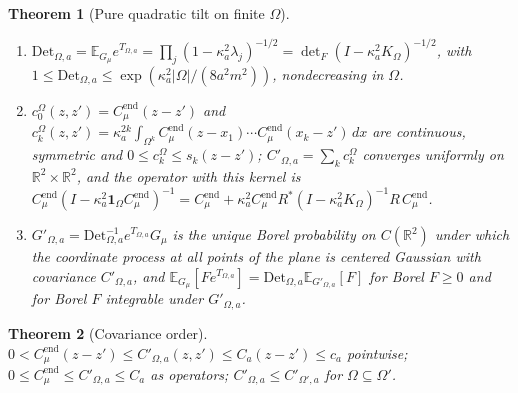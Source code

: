 \documentclass[11pt]{article}
\theoremstyle{plain}
\newtheorem{theorem}{Theorem}[section]
\theoremstyle{definition}
\theoremstyle{remark}
\newcommand{\R}{\mathbb{R}}
\newcommand{\E}{\mathbb{E}}
\newcommand{\ind}{\mathbf{1}}
\newcommand{\Cend}{C^{\mathrm{end}}_{\mu}}
\newcommand{\Det}{\mathrm{Det}}
\begin{document}
\begin{theorem}[Pure quadratic tilt on finite $\Omega$]\label{thm:G-tilt}
\begin{enumerate}[label=(\alph*)]
\item $\Det_{\Omega,a}=\E_{G_\mu}e^{T_{\Omega,a}}=\prod_j(1-\kappa_a^{2}\lambda_j)^{-1/2}
  =\det_F(I-\kappa_a^{2}K_\Omega)^{-1/2}$, with
  $1\le\Det_{\Omega,a}\le\exp(\kappa_a^{2}|\Omega|/(8a^{2}m^{2}))$, nondecreasing in $\Omega$.
\item $c^{\Omega}_0(z,z')=\Cend(z-z')$ and
  $c^{\Omega}_k(z,z')=\kappa_a^{2k}\int_{\Omega^{k}}\Cend(z-x_1)\cdots\Cend(x_k-z')\,dx$ are
  continuous, symmetric and $0\le c^{\Omega}_k\le s_k(z-z')$; $C'_{\Omega,a}=\sum_kc^{\Omega}_k$
  converges uniformly on $\R^{2}\times\R^{2}$, and the operator with this kernel is
  $\Cend(I-\kappa_a^{2}\ind_\Omega\Cend)^{-1}=\Cend+\kappa_a^{2}\Cend R^{*}(I-\kappa_a^{2}K_\Omega)^{-1}R\,\Cend$.
\item $G'_{\Omega,a}=\Det_{\Omega,a}^{-1}e^{T_{\Omega,a}}G_\mu$ is the unique Borel probability
  on $C(\R^{2})$ under which the coordinate process at \emph{all} points of the plane
  is centered Gaussian with covariance $C'_{\Omega,a}$, and
  $\E_{G_\mu}[Fe^{T_{\Omega,a}}]=\Det_{\Omega,a}\E_{G'_{\Omega,a}}[F]$ for Borel $F\ge0$ and
  for Borel $F$ integrable under $G'_{\Omega,a}$.
\end{enumerate}
\end{theorem}

\begin{theorem}[Covariance order]\label{thm:G-order}
$0<\Cend(z-z')\le C'_{\Omega,a}(z,z')\le C_a(z-z')\le c_a$ pointwise;
$0\le\Cend\le C'_{\Omega,a}\le C_a$ as operators; $C'_{\Omega,a}\le C'_{\Omega',a}$ for
$\Omega\subseteq\Omega'$.
\end{theorem}
\end{document}
